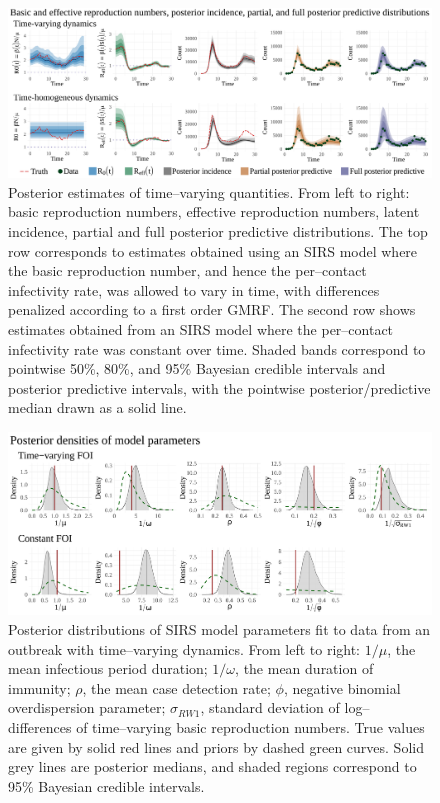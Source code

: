 \begin{figure}
	\centering
	\includegraphics[width=\linewidth]{figures/sinfoi_lna_tparam_plots}
	\caption[Time--varying reproduction numbers, latent incidence, and posterior predictive distributions for SIRS models fit to data from an outbreak with time--varying dynamics.]{Posterior estimates of time--varying quantities. From left to right: basic reproduction numbers, effective reproduction numbers, latent incidence, partial and full posterior predictive distributions. The top row corresponds to estimates obtained using an SIRS model where the basic reproduction number, and hence the per--contact infectivity rate, was allowed to vary in time, with differences penalized according to a first order GMRF. The second row shows estimates obtained from an SIRS model where the per--contact infectivity rate was constant over time. Shaded bands correspond to pointwise 50\%, 80\%, and 95\% Bayesian credible intervals and posterior predictive intervals, with the pointwise posterior/predictive median drawn as a solid line.}
	\label{fig:sinfoi_tparam_plots}
\end{figure}

\begin{figure}[htbp]
	\centering
	\includegraphics[width=\linewidth]{figures/sinfoi_lna_param_plots}
	\caption[Posterior distributions of SIRS model parameters fit to data from an outbreak with time--varying dynamics.]{Posterior distributions of SIRS model parameters fit to data from an outbreak with time--varying dynamics. From left to right: $ 1/\mu $, the mean infectious period duration; $ 1/\omega $, the mean duration of immunity; $ \rho $, the mean case detection rate; $ \phi $, negative binomial overdispersion parameter; $ \sigma_{RW1} $, standard deviation of log--differences of time--varying basic reproduction numbers. True values are given by solid red lines and priors by dashed green curves. Solid grey lines are posterior medians, and shaded regions correspond to 95\% Bayesian credible intervals.}
	\label{fig:sinfoi_param_plots}
\end{figure}

